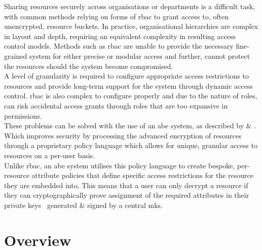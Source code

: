 Sharing resources securely across organisations or departments is a difficult task, with common methods relying on forms of \acrfull{rbac} \citep{Sandhu1996} to grant access to, often unencrypted, resource buckets. In practice, organisational hierarchies are complex in layout and depth, requiring an equivalent complexity in resulting access control models. Methods such as \acrshort{rbac} are unable to provide the necessary fine-grained system for either precise or modular access and further, cannot protect the resources should the system become compromised.\\
A level of granularity is required to configure appropriate access restrictions to resources and provide long-term support for the system through dynamic access control. \acrshort{rbac} is also complex to configure properly and due to the nature of roles, can risk accidental access grants through roles that are too expansive in permissions.\\
These problems can be solved with the use of an \acrfull{abe} system, as described by \citet{Sahai2005} \& \citet{Waters2011}. Which improves security by processing the advanced encryption of resources through a proprietary policy language which allows for unique, granular access to resources on a per-user basis.\\
Unlike \acrshort{rbac}, an \acrshort{abe} system utilises this policy language to create bespoke, per-resource attribute policies that define specific access restrictions for the resource they are embedded into. This means that a user can only decrypt a resource if they can cryptographically prove assignment of the required attributes in their private keys \textemdash\ generated \& signed by a central \acrfull{mks}.

\section{Overview}
\label{sec:intro_overview}

